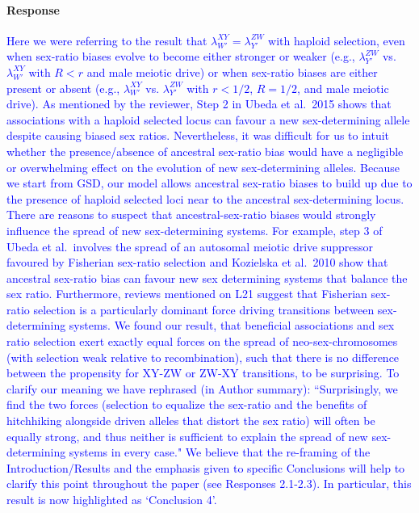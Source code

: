 \documentclass[10pt,letterpaper]{article}
\begin{document}
\noindent\paragraph{Response}
\textcolor{blue}{
Here we were referring to the result that $\lambda_{W'}^{XY} = \lambda_{Y'}^{ZW}$ with haploid selection, even when sex-ratio biases evolve to become either stronger or weaker (e.g., $\lambda_{Y'}^{ZW}$ vs. $\lambda_{W'}^{XY}$ with $R<r$ and male meiotic drive) or when sex-ratio biases are either present or absent (e.g., $\lambda_{W'}^{XY}$ vs. $\lambda_{Y'}^{ZW}$ with $r<1/2$, $R=1/2$, and male meiotic drive).  
As mentioned by the reviewer, Step 2 in Ubeda et al.\ 2015 shows that associations with a haploid selected locus can favour a new sex-determining allele despite causing biased sex ratios. 
Nevertheless, it was difficult for us to intuit whether the presence/absence of ancestral sex-ratio bias would have a negligible or overwhelming effect on the evolution of new sex-determining alleles. 
Because we start from GSD, our model allows ancestral sex-ratio biases to build up due to the presence of haploid selected loci near to the ancestral sex-determining locus. 
There are reasons to suspect that ancestral-sex-ratio biases would strongly influence the spread of new sex-determining systems.
For example, step 3 of Ubeda et al.\ involves the spread of an autosomal meiotic drive suppressor favoured by Fisherian sex-ratio selection and Kozielska et al.\ 2010 show that ancestral sex-ratio bias can favour new sex determining systems that balance the sex ratio.
Furthermore, reviews mentioned on L21 suggest that Fisherian sex-ratio selection is a particularly dominant force driving transitions between sex-determining systems.
We found our result, that beneficial associations and sex ratio selection exert exactly equal forces on the spread of neo-sex-chromosomes (with selection weak relative to recombination), such that there is no difference between the propensity for XY-ZW or ZW-XY transitions, to be surprising.
To clarify our meaning we have rephrased (in Author summary): ``Surprisingly, we find the two forces (selection to equalize the sex-ratio and the benefits of hitchhiking alongside driven alleles that distort the sex ratio) will often be equally strong, and thus neither is sufficient to explain the spread of new sex-determining systems in every case." 
We believe that the re-framing of the Introduction/Results and the emphasis given to specific Conclusions will help to clarify this point throughout the paper (see Responses 2.1-2.3). 
In particular, this result is now highlighted as `Conclusion 4'.
}
\end{document}
